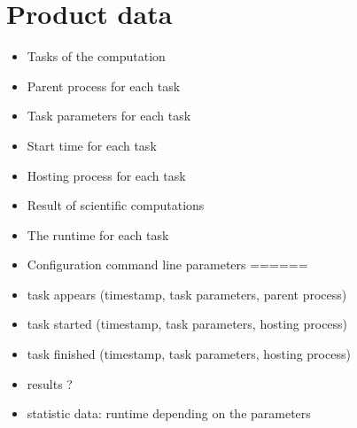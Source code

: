 {


\setcounter{funcD}{10}
\renewcommand{\labelitemi}{
	\ifnum \value{funcD}<10$/D 0\arabic{funcD} /$\addtocounter{funcD}{10}
	\else $/D \arabic{funcD} /$\addtocounter{funcD}{10}\fi
	}
\section{Product data}
	\begin{itemize}
		\item Tasks of the computation
		\item Parent process for each task
		\item Task parameters for each task
		\item Start time for each task
		\item Hosting process for each task
		\item Result of scientific computations
		\item The runtime for each task
		\item Configuration command line parameters
		======		
		\item task appears (timestamp, task parameters, parent process)
		\item task started (timestamp, task parameters, hosting process)
		\item task finished (timestamp, task parameters, hosting process)
		\item results ?
		\item statistic data: runtime depending on the parameters
	
	\end{itemize}

}